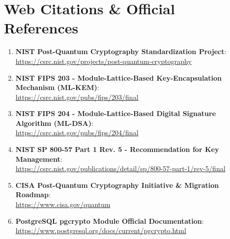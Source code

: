 \documentclass[11pt,a4paper,landscape]{article}
\begin{document}
\vspace{1.5em}

\section{Web Citations \& Official References}

\begin{enumerate}
    \item \textbf{NIST Post-Quantum Cryptography Standardization Project}: \\
    \url{https://csrc.nist.gov/projects/post-quantum-cryptography}
    \item \textbf{NIST FIPS 203 - Module-Lattice-Based Key-Encapsulation Mechanism (ML-KEM)}: \\
    \url{https://csrc.nist.gov/pubs/fips/203/final}
    \item \textbf{NIST FIPS 204 - Module-Lattice-Based Digital Signature Algorithm (ML-DSA)}: \\
    \url{https://csrc.nist.gov/pubs/fips/204/final}
    \item \textbf{NIST SP 800-57 Part 1 Rev. 5 - Recommendation for Key Management}: \\
    \url{https://csrc.nist.gov/publications/detail/sp/800-57-part-1/rev-5/final}
    \item \textbf{CISA Post-Quantum Cryptography Initiative \& Migration Roadmap}: \\
    \url{https://www.cisa.gov/quantum}
    \item \textbf{PostgreSQL pgcrypto Module Official Documentation}: \\
    \url{https://www.postgresql.org/docs/current/pgcrypto.html}
\end{enumerate}
\end{document}
